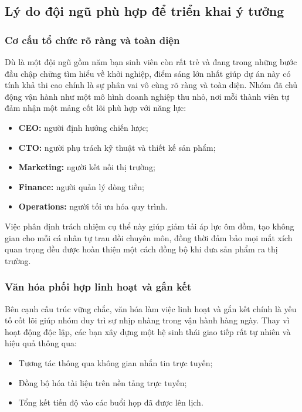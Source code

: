 \subsection{Lý do đội ngũ phù hợp để triển khai ý tưởng}
\subsubsection{Cơ cấu tổ chức rõ ràng và toàn diện}
 
Dù là một đội ngũ gồm năm bạn sinh viên còn rất trẻ và đang trong những bước đầu chập chững tìm hiểu về khởi nghiệp, điểm sáng lớn nhất giúp dự án này có tính khả thi cao chính là sự phân vai vô cùng rõ ràng và toàn diện. Nhóm đã chủ động vận hành như một mô hình doanh nghiệp thu nhỏ, nơi mỗi thành viên tự đảm nhận một mảng cốt lõi phù hợp với năng lực:
 
\begin{itemize}
    \item \textbf{CEO:} người định hướng chiến lược;
    \item \textbf{CTO:} người phụ trách kỹ thuật và thiết kế sản phẩm;
    \item \textbf{Marketing:} người kết nối thị trường;
    \item \textbf{Finance:} người quản lý dòng tiền;
    \item \textbf{Operations:} người tối ưu hóa quy trình.
\end{itemize}
 
Việc phân định trách nhiệm cụ thể này giúp giảm tải áp lực ôm đồm, tạo không gian cho mỗi cá nhân tự trau dồi chuyên môn, đồng thời đảm bảo mọi mắt xích quan trọng đều được hoàn thiện một cách đồng bộ khi đưa sản phẩm ra thị trường.
 
\subsubsection{Văn hóa phối hợp linh hoạt và gắn kết}
 
Bên cạnh cấu trúc vững chắc, văn hóa làm việc linh hoạt và gắn kết chính là yếu tố cốt lõi giúp nhóm duy trì sự nhịp nhàng trong vận hành hàng ngày. Thay vì hoạt động độc lập, các bạn xây dựng một hệ sinh thái giao tiếp rất tự nhiên và hiệu quả thông qua:
 
\begin{itemize}
    \item Tương tác thông qua không gian nhắn tin trực tuyến;
    \item Đồng bộ hóa tài liệu trên nền tảng trực tuyến;
    \item Tổng kết tiến độ vào các buổi họp đã được lên lịch.
\end{itemize}
 
